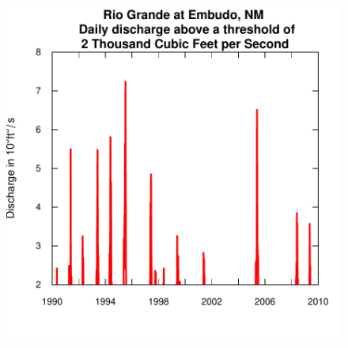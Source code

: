 \documentclass[a4paper,11pt]{article}
\begin{document}
\begin{figure}[htbp]
  \begin{minipage}[h]{0.5\linewidth}
    \begin{center}

\includegraphics{EGRET-figplotQTimeDaily}
    \label{fig:plotQTimeDaily}
    \end{center}
  \end{minipage}
  \hspace{0.5cm}
  \caption{}
  \label{fig:plotQTimeDailyAND}
\end{figure}
\end{document}
